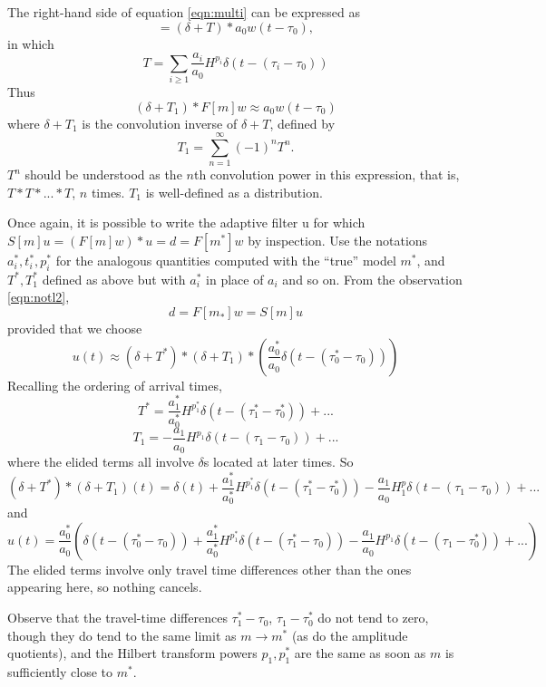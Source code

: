 The right-hand side of equation \ref{eqn:multi} can be expressed as
\[
  = (\delta + T) * a_0w(t-\tau_0),
\]
in which 
\[
  T = \sum_{i \ge 1}
  \frac{a_i}{a_0}H^{p_i}\delta(t-(\tau_i-\tau_0))
\]
Thus
\begin{equation}
  \label{eqn:unwrap}
  (\delta +T_1) * F[m]w \approx  a_0w(t-\tau_0)
\end{equation}
where $\delta + T_1$ is the convolution inverse of $\delta + T$,
defined by 
\[
  T_1 = \sum_{n=1}^{\infty} (-1)^n T^n.
\]
$T^n$ should be understood as the $n$th convolution power in this
expression, that is, $T*T*...*T$, $n$ times. $T_1$ is well-defined as a distribution.

Once again, it is possible to write the adaptive filter u for which $S[m]u = (F[m]w)*u = d =
F[m^*]w$ by inspection. Use the notations $a^*_i, t^*_i, p^*_i$ for
the analogous quantities computed with the ``true'' model $m^*$, and
$T^*, T_1^*$ defined as above but with $a^*_i$ in place of $a_i$ and so
on. From the observation \ref{eqn:notl2},
\[
  d = F[m_*]w = S[m]u
\]
provided that we choose
\begin{equation}
  \label{eqn:notl2again}
u(t) \approx (\delta + T^*)*(\delta +
T_1)*\left(\frac{a^*_0}{a_0}\delta(t - (\tau^*_0-\tau_0))\right)
\end{equation}
Recalling the ordering of arrival times, 
\[
  T^* = \frac{a^*_1}{a^*_0}H^{p_1^*} \delta(t-(\tau^*_1-\tau^*_0)) + ...
\]
\[
  T_1 = -\frac{a_1}{a_0}H^{p_1} \delta(t-(\tau_1-\tau_0)) + ...
\]
where the elided terms all involve $\delta$s located at later times.
So
\[
  (\delta + T^*)*(\delta + T_1)(t) = \delta(t)  +  \frac{a^*_1}{a^*_0}
  H^{p_1^*}\delta(t-(\tau^*_1-\tau^*_0)) -\frac{a_1}{a_0}H^p_1
  \delta(t-(\tau_1-\tau_0)) + ...
\]
and
\begin{equation}
  \label{eqn:notl2explicit}
  u(t) = \frac{a^*_0}{a_0}\left(\delta(t - (\tau^*_0-\tau_0)) +
    \frac{a^*_1}{a^*_0}H^{p_1^*}\delta(t-(\tau^*_1-\tau_0)) -
    \frac{a_1}{a_0}H^{p_1}\delta(t-(\tau_1-\tau_0^*)) + ...\right)
\end{equation}
The elided terms involve only travel time differences other than the
ones appearing here, so nothing cancels.

Observe that the travel-time differences $\tau^*_1-\tau_0$,
$\tau_1-\tau_0^*$ do not tend to zero, though they do tend to the same
limit as $m \rightarrow m^*$ (as do the amplitude quotients), and the
Hilbert transform powers $p_1, p_1^*$ are the same as soon as $m$ is
sufficiently close to $m^*$.

